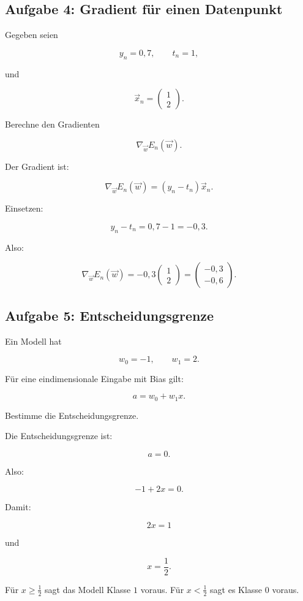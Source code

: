 \subsection{Aufgabe 4: Gradient für einen Datenpunkt}

Gegeben seien

\[
    y_n=0{,}7,
    \qquad
    t_n=1,
\]

und

\[
    \vec{x}_n
    =
    \begin{pmatrix}
        1 \\
        2
    \end{pmatrix}.
\]

Berechne den Gradienten

\[
    \nabla_{\vec{w}}E_n(\vec{w}).
\]

\begin{examplebox}
Der Gradient ist:

\[
    \nabla_{\vec{w}}E_n(\vec{w})
    =
    (y_n-t_n)\vec{x}_n.
\]

Einsetzen:

\[
    y_n-t_n
    =
    0{,}7-1
    =
    -0{,}3.
\]

Also:

\[
    \nabla_{\vec{w}}E_n(\vec{w})
    =
    -0{,}3
    \begin{pmatrix}
        1 \\
        2
    \end{pmatrix}
    =
    \begin{pmatrix}
        -0{,}3 \\
        -0{,}6
    \end{pmatrix}.
\]
\end{examplebox}

\subsection{Aufgabe 5: Entscheidungsgrenze}

Ein Modell hat

\[
    w_0=-1,
    \qquad
    w_1=2.
\]

Für eine eindimensionale Eingabe mit Bias gilt:

\[
    a
    =
    w_0+w_1x.
\]

Bestimme die Entscheidungsgrenze.

\begin{examplebox}
Die Entscheidungsgrenze ist:

\[
    a=0.
\]

Also:

\[
    -1+2x=0.
\]

Damit:

\[
    2x=1
\]

und

\[
    x=\frac{1}{2}.
\]

Für \(x\geq \frac{1}{2}\) sagt das Modell Klasse \(1\) voraus.
Für \(x<\frac{1}{2}\) sagt es Klasse \(0\) voraus.
\end{examplebox}


